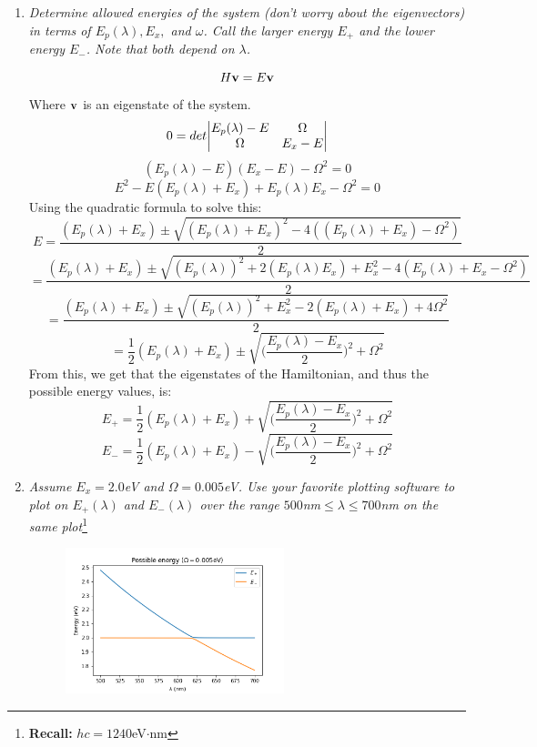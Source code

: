 \documentclass[12pt]{article}
\begin{document}
\begin{enumerate}[label=\alph*)]
\item \emph{Determine allowed energies of the system (don't worry about the eigenvectors) in terms of $E_p(\lambda), E_x,$ and $\omega$. Call the larger energy $E_+$ and the lower energy $E_-$. Note that both depend on $\lambda$.}

\[H\vb{v} = E \vb{v}\]
Where $\vb{v}$ is an eigenstate of the system. 
\[0 = det\mqty|E_p(\lambda) -E & \Omega \\ \Omega & E_x - E|\]
\[(E_p(\lambda) - E)(E_x-E) - \Omega^2 = 0\]
\[E^2 - E(E_p(\lambda) + E_x) + E_p(\lambda)E_x - \Omega^2 = 0\]
Using the quadratic formula to solve this:
\[E = \frac{(E_p(\lambda) + E_x) \pm \sqrt{(E_p(\lambda)+E_x)^2 - 4((E_p(\lambda)+ E_x) - \Omega^2)}}{2}\]
\[ = \frac{(E_p(\lambda)+ E_x) \pm \sqrt{(E_p(\lambda))^2 + 2(E_p(\lambda)E_x) + E_x^2 - 4(E_p(\lambda)+ E_x - \Omega^2)}}{2}\]
\[= \frac{(E_p(\lambda)+ E_x) \pm \sqrt{(E_p(\lambda))^2 + E_x^2 -2(E_p(\lambda) + E_x) + 4\Omega^2}}{2}\]
\[= \frac{1}{2}(E_p(\lambda)+ E_x) \pm \sqrt{\Big(\frac{E_p(\lambda) - E_x}{2}\Big)^2 + \Omega^2}\]
From this, we get that the eigenstates of the Hamiltonian, and thus the possible energy values, is:
\[\boxed{E_+ = \frac{1}{2}(E_p(\lambda)+ E_x) + \sqrt{\Big(\frac{E_p(\lambda) - E_x}{2}\Big)^2 + \Omega^2}}\]
\[\boxed{E_- = \frac{1}{2}(E_p(\lambda)+ E_x) - \sqrt{\Big(\frac{E_p(\lambda) - E_x}{2}\Big)^2 + \Omega^2}}\]

\item \emph{Assume $E_x = 2.0$eV and $\Omega=0.005$eV. Use your favorite plotting software to plot on $E_+(\lambda)$ and $E_-(\lambda)$ over the range $500$nm$\leq \lambda \leq 700$nm on the same plot}\footnote{\textbf{Recall:} $h c = 1240$eV$\cdot$nm}

\begin{figure}[!ht]
\centering
\includegraphics[width=0.60\textwidth]{./hw09_1.png}
\label{fig:1_1}
\end{figure}


\end{enumerate}
\end{document}
